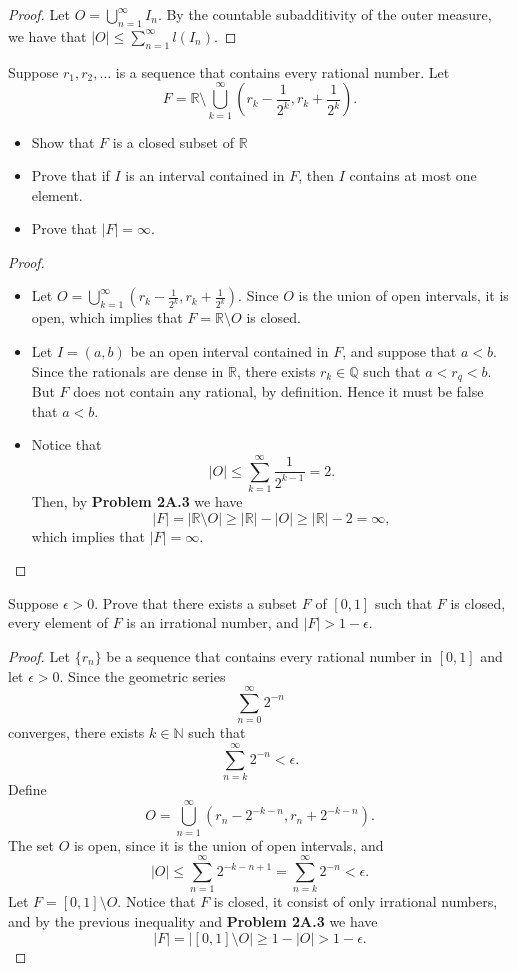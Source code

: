 \documentclass[14.5pt]{article}
\newcommand{\N}{\mathbb{N}}
\newcommand{\Q}{\mathbb{Q}}
\newcommand{\R}{\mathbb{R}}
\newenvironment{problem}[2][Problem]{\begin{mdframed}[backgroundcolor=gray!10, leftline = false, rightline=false, linewidth=0.25pt]  \begin{trivlist}
\item[\hskip \labelsep {\bfseries #1}\hskip \labelsep {\bfseries #2.}]}{\end{trivlist} \end{mdframed}  }
\begin{document}
\begin{proof}
Let $O = \bigcup_{n=1}^\infty I_n$. By the countable subadditivity of the outer measure, we have that $\left\lvert O \right\rvert \leq \sum_{n=1}^\infty l(I_n).$
\end{proof}

\begin{problem}{2A.12}
    Suppose $r_1, r_2, \ldots$ is a sequence that contains every rational number. Let
$$F = \R \setminus \bigcup_{k=1}^\infty \left(r_k - \frac{1}{2^k}, r_k + \frac{1}{2^k} \right).$$
\begin{itemize}
    \item[(a)]Show that $F$ is a closed subset of $\R$
    \item[(b)]  Prove that if $I$ is an interval contained in $F$, then $I$ contains at most one element.
    \item[(c)] Prove that $|F| = \infty$.
\end{itemize}
\end{problem}
\begin{proof}
    \textbf{}
    \begin{itemize}
        \item[(a)] Let $O=\bigcup_{k=1}^\infty \left(r_k - \frac{1}{2^k}, r_k + \frac{1}{2^k} \right).$ Since $O$ is the union of open intervals, it is open, which implies that $F = \R \setminus O$ is closed. 
        \item[(b)] Let $I = (a,b)$ be an open interval contained in $F$, and suppose that $a < b$. Since the rationals are dense in $\R$, there exists $r_k\in \Q$ such that $a < r_q < b.$ But $F$ does not contain any rational, by definition. Hence it must be false that $a < b.$ 
        \item[(c)] Notice that 
        $$|O| \leq \sum_{k=1}^\infty \frac{1}{2^{k-1}} = 2.$$
        Then, by \textbf{Problem 2A.3} we have
        $$|F| = | \R \setminus O | \geq | \R | - | O | \geq  | \R | - 2 = \infty,$$
        which implies that $|F| = \infty.$
    \end{itemize}
\end{proof}

\begin{problem}{2A.13}
    Suppose $\epsilon > 0$. Prove that there exists a subset $F$ of $[0, 1]$ such that $F$ is closed, every element of $F$ is an irrational number, and $|F| > 1 - \epsilon$.
\end{problem}
\begin{proof}
    Let $\{r_n\}$ be a sequence that contains every rational number in $[0,1]$ and let $\epsilon > 0$. Since the geometric series
    $$\sum_{n=0}^{\infty}  2^{-n}$$
    converges, there exists $k\in \N$ such that
    $$\sum_{n=k}^{\infty}  2^{-n} < \epsilon.$$
    Define 
    $$O = \bigcup_{n=1}^\infty (r_n -  2^{-k-n}, r_n + 2^{-k-n}).$$
    The set $O$ is open, since it is the union of open intervals, and
    $$|O| \leq \sum_{n=1}^\infty 2^{-k-n+1}  = \sum_{n=k}^\infty 2^{-n} < \epsilon.$$
    Let $F = [0, 1] \setminus O$. Notice that $F$ is closed, it consist of only irrational numbers, and by the previous inequality and \textbf{Problem 2A.3} we have 
    $$|F| = |[0,1 ] \setminus O| \geq 1- |O| > 1 - \epsilon.$$
\end{proof}
\end{document}

